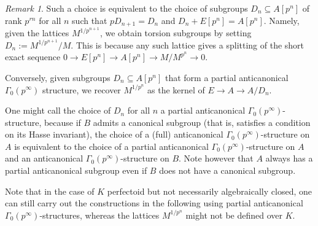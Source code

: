 \documentclass[10pt,oneside]{amsart}
\theoremstyle{definition}
\theoremstyle{remark}
\newtheorem{remark}[theorem]{Remark}
\begin{document}
	\begin{remark}
		Such a choice is equivalent to the choice of subgroups $D_n\subseteq A[p^n]$ of rank $p^{rn}$ for all $n$ such that $pD_{n+1}=D_n$ and $D_n+E[p^n]=A[p^n]$. Namely,
		given the lattices $M^{1/p^{n+1}}$, we obtain torsion subgroups by setting $D_n:=M^{1/p^{n+1}}/M$. This is because any such lattice gives a splitting of the short exact sequence $0\rightarrow E[p^n]\rightarrow A[p^n]\rightarrow M/M^{p^n} \rightarrow 0$.
		
		Conversely, given subgroups $D_n\subseteq A[p^n]$ that form a partial anticanonical $\Gamma_0(p^\infty)$ structure, we recover $M^{1/p^n}$ as the kernel of $E\rightarrow A\rightarrow A/D_n$.
		
		One might call the choice of $D_n$ for all $n$ a partial anticanonical $\Gamma_0(p^\infty)$-structure, because if $B$ admits a canonical subgroup (that is, satisfies a condition on its Hasse invariant), the choice of a (full) anticanonical $\Gamma_0(p^\infty)$-structure on $A$ is equivalent to the choice of a partial anticanonical $\Gamma_0(p^\infty)$-structure on $A$ and an anticanonical $\Gamma_0(p^\infty)$-structure on $B$. Note however that $A$ always has a partial anticanonical subgroup even if $B$ does not have a canonical subgroup.
		
		Note that in the case of $K$ perfectoid but not necessarily algebraically closed, one can still carry out the constructions in the following using partial anticanonical $\Gamma_0(p^\infty)$-structures, whereas the lattices $M^{1/p^n}$ might not be defined over $K$.
	\end{remark}
	
\end{document}
